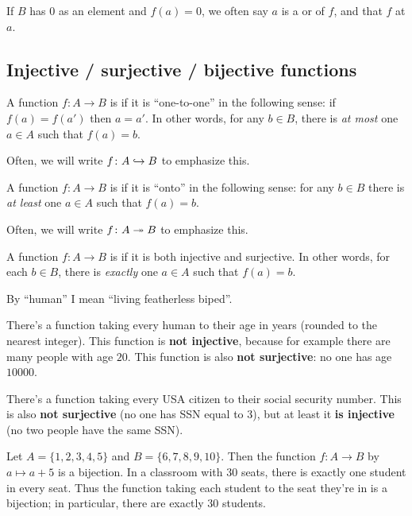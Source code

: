 If $B$ has $0$ as an element and $f(a) = 0$,
we often say $a$ is a  or  of $f$,
and that $f$  at $a$.

\subsection{Injective / surjective / bijective functions}

\begin{definition}
	A function $f \colon A \to B$ is 
	if it is ``one-to-one'' in the following sense:
	if $f(a) = f(a')$ then $a = a'$.
	In other words, for any $b \in B$,
	there is \emph{at most} one $a \in A$ such that $f(a) = b$.

	Often, we will write $f \colon A \hookrightarrow B$ to emphasize this.
\end{definition}
\begin{definition}
	A function $f \colon A \to B$ is 
	if it is ``onto'' in the following sense:
	for any $b \in B$ there is \emph{at least} one $a \in A$
	such that $f(a) = b$.

	Often, we will write $f \colon A \twoheadrightarrow B$ to emphasize this.
\end{definition}
\begin{definition}
	A function $f \colon A \to B$ is 
	if it is both injective and surjective.
	In other words, for each $b \in B$,
	there is \emph{exactly} one $a \in A$ such that $f(a) = b$.
\end{definition}

\begin{example}
	By ``human'' I mean ``living featherless biped''.
	\begin{enumerate}[(a)]
		\ii There's a function taking every human to their
		age in years (rounded to the nearest integer).
		This function is \textbf{not injective},
		because for example there are many people with age $20$.
		This function is also \textbf{not surjective}: no one has age $10000$.

		\ii There's a function taking every
		USA citizen to their social security number.
		This is also \textbf{not surjective} (no one has SSN equal to $3$),
		but at least it \textbf{is injective} (no two people have the same SSN).
	\end{enumerate}
\end{example}

\begin{example}
	\listhack
	\begin{enumerate}[(a)]
		\ii Let $A = \{1,2,3,4,5\}$ and $B = \{6,7,8,9,10\}$.
		Then the function $f \colon A \to B$ by $a \mapsto a+5$ is a bijection.
		\ii In a classroom with $30$ seats,
		there is exactly one student in every seat.
		Thus the function taking each student to the seat they're in
		is a bijection; in particular, there are exactly $30$ students.
	\end{enumerate}
\end{example}

